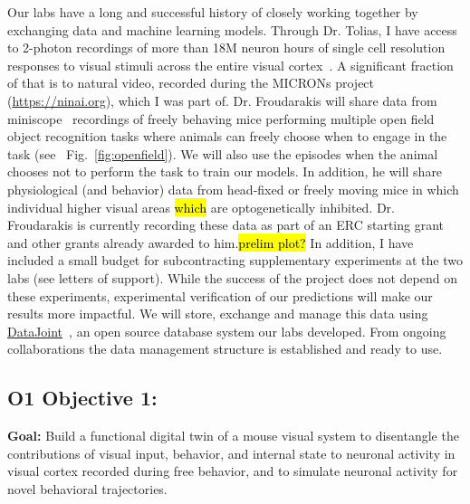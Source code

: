 \documentclass[B2,COG]{ercgrant}
\begin{document}
Our labs have a long and successful history of closely working together by exchanging data and machine learning models. 
Through Dr. Tolias, I have access to 2-photon recordings of more than 18M neuron hours of single cell resolution responses to visual stimuli across the entire visual cortex~\parencite{Sofroniew2016-xg}. A significant fraction of that is to natural video, recorded during the MICRONs project (\url{https://ninai.org}), which I was part of.
Dr. Froudarakis will share data from miniscope~\parencite{Cai2016-rh}
recordings of freely behaving mice performing multiple open field object recognition tasks where animals can freely choose when to engage in the task (see \eg~Fig.~\ref{fig:openfield}). 
We will also use the episodes when the animal chooses not to perform the task to train our models. 
In addition, he will share physiological (and behavior) data from head-fixed or freely moving mice in which individual higher visual areas \hl{which} are optogenetically inhibited.
Dr. Froudarakis is currently recording these data as part of an ERC starting grant and other grants already awarded to him.\hl{prelim plot?} 
In addition, I have included a small budget for subcontracting supplementary experiments at the two labs (see letters of support).  
While the success of the project does not depend on these experiments, experimental verification of our predictions will make our results more impactful.
We will store, exchange and manage this data using \href{https://www.datajoint.org/}{DataJoint}~\parencite{Yatsenko2015-id}, an open source database system our labs developed. 
From ongoing collaborations the data management structure is established and ready to use.

\subsection{\colorbox{obj1}{\color{white}O1} Objective 1: \oonetitle}

\textbf{Goal:} Build a functional digital twin of a mouse visual system to disentangle the contributions of visual input, behavior, and internal state to neuronal activity in visual cortex recorded during free behavior, and to simulate neuronal activity for novel behavioral trajectories.
\end{document}

